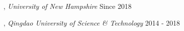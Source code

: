 
, \textit{University of New Hampshire}	\hfill Since 2018

, \textit{Qingdao University of Science \& Technology} \hfill	2014 - 2018

